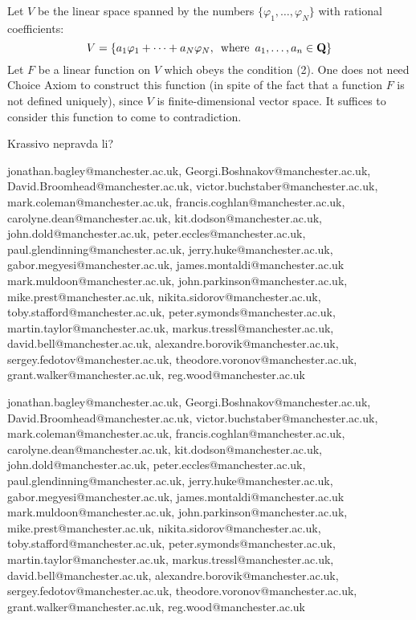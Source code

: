    Let $V$ be the linear space spanned by the numbers $\{\varphi_1,\dots,\varphi_N\}$ with rational coefficients:
              $$
      V=\{a_1\varphi_1+\dots+a_N\varphi_N,\,\,\,{\rm where}\,\,\, a_1,\dots,a_n\in {\bf Q}\}
              $$
 Let $F$ be a linear function on $V$ which obeys the condition (2). One does not need Choice Axiom to
 construct this function (in spite of the fact that a function $F$ is not defined uniquely),
 since  $V$ is finite-dimensional vector space.
It  suffices to consider this function to come to contradiction.

   Krassivo nepravda li?








    \bye

          jonathan.bagley@manchester.ac.uk,
          Georgi.Boshnakov@manchester.ac.uk,
          David.Broomhead@manchester.ac.uk,
          victor.buchstaber@manchester.ac.uk,
          mark.coleman@manchester.ac.uk,
          francis.coghlan@manchester.ac.uk,
          carolyne.dean@manchester.ac.uk,
          kit.dodson@manchester.ac.uk,
          john.dold@manchester.ac.uk,
          peter.eccles@manchester.ac.uk,
          paul.glendinning@manchester.ac.uk,
          jerry.huke@manchester.ac.uk,
          gabor.megyesi@manchester.ac.uk,
          james.montaldi@manchester.ac.uk
          mark.muldoon@manchester.ac.uk,
          john.parkinson@manchester.ac.uk,
          mike.prest@manchester.ac.uk,
          nikita.sidorov@manchester.ac.uk,
          toby.stafford@manchester.ac.uk,
          peter.symonds@manchester.ac.uk,
          martin.taylor@manchester.ac.uk,
          markus.tressl@manchester.ac.uk,
          david.bell@manchester.ac.uk,
          alexandre.borovik@manchester.ac.uk,
          sergey.fedotov@manchester.ac.uk,
          theodore.voronov@manchester.ac.uk,
          grant.walker@manchester.ac.uk,
          reg.wood@manchester.ac.uk


         jonathan.bagley@manchester.ac.uk,
          Georgi.Boshnakov@manchester.ac.uk,
          David.Broomhead@manchester.ac.uk,
          victor.buchstaber@manchester.ac.uk,
          mark.coleman@manchester.ac.uk,
          francis.coghlan@manchester.ac.uk,
          carolyne.dean@manchester.ac.uk,
          kit.dodson@manchester.ac.uk,
          john.dold@manchester.ac.uk,
          peter.eccles@manchester.ac.uk,
          paul.glendinning@manchester.ac.uk,
          jerry.huke@manchester.ac.uk,
          gabor.megyesi@manchester.ac.uk,
          james.montaldi@manchester.ac.uk
          mark.muldoon@manchester.ac.uk,
          john.parkinson@manchester.ac.uk,
          mike.prest@manchester.ac.uk,
          nikita.sidorov@manchester.ac.uk,
          toby.stafford@manchester.ac.uk,
          peter.symonds@manchester.ac.uk,
          martin.taylor@manchester.ac.uk,
          markus.tressl@manchester.ac.uk,
          david.bell@manchester.ac.uk,
          alexandre.borovik@manchester.ac.uk,
          sergey.fedotov@manchester.ac.uk,
          theodore.voronov@manchester.ac.uk,
          grant.walker@manchester.ac.uk,
          reg.wood@manchester.ac.uk
